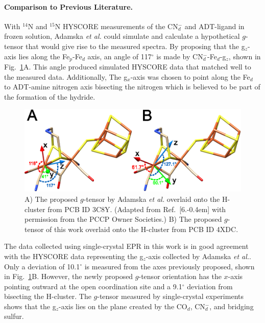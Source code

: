\paragraph{Comparison to Previous Literature.} With $^{14}$N and $^{15}$N HYSCORE measurements of the CN$_d^-$ and ADT-ligand in frozen solution, Adamska \textit{et al.} could simulate and calculate a hypothetical $g$-tensor that would give rise to the measured spectra. \cite{Adamska2015} By proposing that the g$_z$-axis lies along the Fe$_p$-Fe$_d$ axis, an angle of 117$^\circ$ is made by CN$_d^-$-Fe$_d$-g$_z$, shown in Fig.~\ref{fig:gTensor}A. This angle produced simulated HYSCORE data that matched well to the measured data. Additionally, The g$_x$-axis was chosen to point along the Fe$_d$ to ADT-amine nitrogen axis bisecting the nitrogen which is believed to be part of the formation of the hydride.

\begin{figure}[ht]
\centering
\includegraphics{Kapitel/Appendix/Images/S6-gTensorCompare.eps}
\caption[Comparison of the proposed $g$-tensor.]{A) The proposed $g$-tensor by Adamska \textit{et al.} overlaid onto the H-cluster from PCB ID 3C8Y. (Adapted from Ref.~[6.\kern-0.4em] with permission from the PCCP Owner Societies.) B) The proposed $g$-tensor of this work overlaid onto the H-cluster from PCB ID 4XDC.\cite{FeFeCry}}
\label{fig:gTensor}
\end{figure}

The data collected using single-crystal EPR in this work is in good agreement with the HYSCORE data representing the g$_z$-axis collected by Adamska \textit{et al.}. Only a deviation of 10.1$^{\circ}$ is measured from the axes previously proposed, shown in Fig.~\ref{fig:gTensor}B. However, the newly proposed $g$-tensor orientation has the $x$-axis pointing outward at the open coordination site and a 9.1$^{\circ}$ deviation from bisecting the H-cluster. The $g$-tensor measured by single-crystal experiments shows that the g$_z$-axis lies on the plane created by the CO$_d$, CN$_d^-$, and bridging sulfur. 

